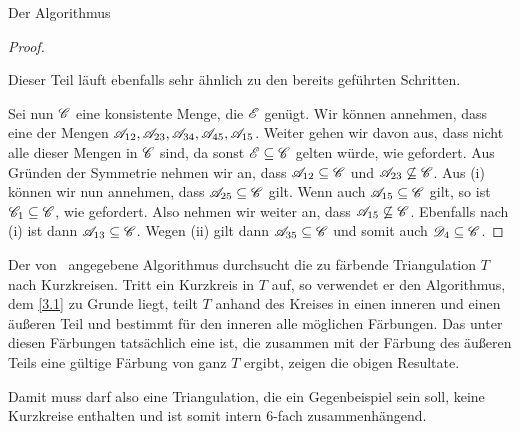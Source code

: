 \begin{section}{Der Algorithmus}
\begin{proof}
\begin{enumerate}[(i)]
   Dieser Teil läuft ebenfalls sehr ähnlich zu den bereits geführten Schritten.
  \end{enumerate}
  Sei nun $\mathscr{C}$ eine konsistente Menge, die $\mathscr{E}$ genügt. Wir können annehmen, dass eine der Mengen $\mathscr{A}_{12},\mathscr{A}_{23},\mathscr{A}_{34},\mathscr{A}_{45},\mathscr{A}_{15}$. Weiter gehen wir davon aus, dass nicht alle dieser Mengen in $\mathscr{C}$ sind, da sonst $\mathscr{E}\subseteq\mathscr{C}$ gelten würde, wie gefordert. Aus Gründen der Symmetrie nehmen wir an, dass $\mathscr{A}_{12}\subseteq\mathscr{C}$ und $\mathscr{A}_{23}\not\subseteq\mathscr{C}$. Aus (i) können wir nun annehmen, dass $\mathscr{A}_{25}\subseteq\mathscr{C}$ gilt. Wenn auch $\mathscr{A}_{15}\subseteq\mathscr{C}$ gilt, so ist $\mathscr{C}_1\subseteq\mathscr{C}$, wie gefordert. Also nehmen wir weiter an, dass $\mathscr{A}_{15}\not\subseteq\mathscr{C}$. Ebenfalls nach (i) ist dann $\mathscr{A}_{13}\subseteq\mathscr{C}$. Wegen (ii) gilt dann $\mathscr{A}_{35}\subseteq\mathscr{C}$ und somit auch $\mathscr{D}_4\subseteq\mathscr{C}$.
 \end{proof}
 
 Der von \rsst\-\ angegebene Algorithmus durchsucht die zu färbende Triangulation $T$ nach Kurzkreisen. Tritt ein Kurzkreis in $T$ auf, so verwendet er den Algorithmus, dem \ref{3.1} zu Grunde liegt, teilt $T$ anhand des Kreises in einen inneren und einen äußeren Teil und bestimmt für den inneren alle möglichen Färbungen. Das unter diesen Färbungen tatsächlich eine ist, die zusammen mit der Färbung des äußeren Teils eine gültige Färbung von ganz $T$ ergibt, zeigen die obigen Resultate.
 
 Damit muss darf also eine Triangulation, die ein Gegenbeispiel sein soll, keine Kurzkreise enthalten und ist somit intern 6-fach zusammenhängend.
\end{section}